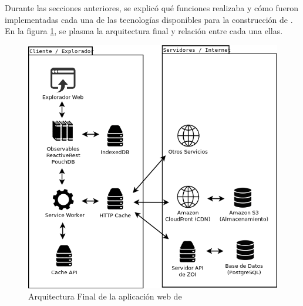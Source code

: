 Durante las secciones anteriores, se explicó qué funciones realizaba y cómo fueron implementadas cada una de las tecnologías disponibles para la construcción de \pwas. En la figura \ref{fig:diagram}, se plasma la arquitectura final y relación entre cada una ellas.

\begin{figure}
  \includegraphics[width=\linewidth]{figures/diagram/diagram.png}
  \caption{Arquitectura Final de la aplicación web de \business}
  \label{fig:diagram}
\end{figure}
